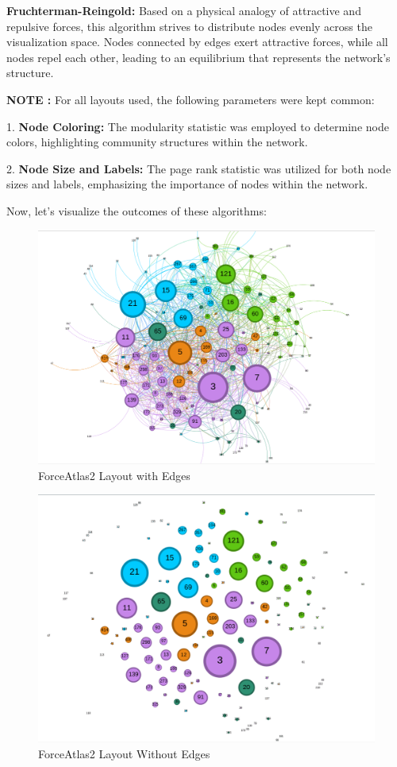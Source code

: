 \documentclass[conference]{IEEEtran}
\begin{document}
\textbf{Fruchterman-Reingold:} Based on a physical analogy of attractive and repulsive forces, this algorithm strives to distribute nodes evenly across the visualization space. Nodes connected by edges exert attractive forces, while all nodes repel each other, leading to an equilibrium that represents the network's structure.

\vspace{0.8cm}

\textbf{NOTE : }
For all layouts used, the following parameters were kept common:

1. \textbf{Node Coloring:} The modularity statistic was employed to determine node colors, highlighting community structures within the network.

2. \textbf{Node Size and Labels:} The page rank statistic was utilized for both node sizes and labels, emphasizing the importance of nodes within the network.


\vspace{0.8cm}

Now, let's visualize the outcomes of these algorithms:

\begin{figure}[h]
  \centering
  \includegraphics[width=0.7\linewidth]{./images_ricky/sampled__forceAtlas2_withEdges.png}
  \caption{ForceAtlas2 Layout with Edges}
  \label{fig:forceAtlas2_with_edges}
\end{figure}

\begin{figure}[h]
  \centering
  \includegraphics[width=0.7\linewidth]{./images_ricky/sampled_forceAtlas2_withoutEdges.png}
  \caption{ForceAtlas2 Layout Without Edges}
  \label{fig:forceAtlas2_without_edges}
\end{figure}
\end{document}

